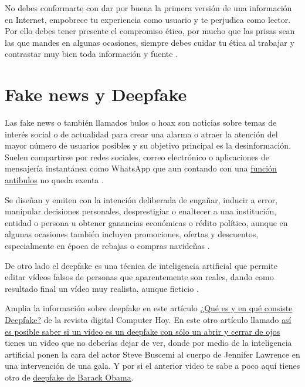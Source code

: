 \documentclass[
  a4paper,
  openany]{book}
\begin{document}
No debes conformarte con dar por buena la primera versión de una información en Internet, empobrece tu experiencia como usuario y te perjudica como lector. Por ello debes tener presente el compromiso ético, por mucho que las prisas sean las que mandes en algunas ocasiones, siempre debes cuidar tu ética al trabajar y contrastar muy bien toda información y fuente \citep{contrastar-informacion}.

\hypertarget{fake-news-y-deepfake}{%
\section{Fake news y Deepfake}\label{fake-news-y-deepfake}}

Las fake news o también llamados bulos o hoax son noticias sobre temas de interés social o de actualidad para crear una alarma o atraer la atención del mayor número de usuarios posibles y su objetivo principal es la desinformación. Suelen compartirse por redes sociales, correo electrónico o aplicaciones de mensajería instantánea como WhatsApp que aun contando con una \href{https://www.osi.es/es/actualidad/blog/2020/04/27/whatsapp-y-su-funcion-antibulos-descubrela}{función antibulos} no queda exenta \citep{OSI-bulos-buenas-practicas}.

Se diseñan y emiten con la intención deliberada de engañar, inducir a error, manipular decisiones personales, desprestigiar o enaltecer a una institución, entidad o persona u obtener ganancias económicas o rédito político, aunque en algunas ocasiones también incluyen promociones, ofertas y descuentos, especialmente en época de rebajas o compras navideñas \citep{WIKI-fake-news}.

De otro lado el deepfake es una técnica de inteligencia artificial que permite editar vídeos falsos de personas que aparentemente son reales, dando como resultado final un vídeo muy realista, aunque ficticio \citep{WIKI-deepfake}.

Amplia la información sobre deepfake en este artículo \href{https://computerhoy.com/reportajes/tecnologia/consiste-deepfake-446355}{¿Qué es y en qué consiste Deepfake?} de la revista digital Computer Hoy. En este otro artículo llamado \href{https://www.xataka.com/inteligencia-artificial/posible-saber-video-deepfake-solo-abrir-cerrar-ojos-literalmente-quizas-eso-no-sea-suficiente}{así es posible saber si un vídeo es un deepfake con sólo un abrir y cerrar de ojos} tienes un video que no deberías dejar de ver, donde por medio de la inteligencia artificial ponen la cara del actor Steve Buscemi al cuerpo de Jennifer Lawrence en una intervención de una gala. Y por si el anterior video te sabe a poco aquí tienes otro de \href{https://www.youtube.com/watch?v=cQ54GDm1eL0}{deepfake de Barack Obama}.
\end{document}
